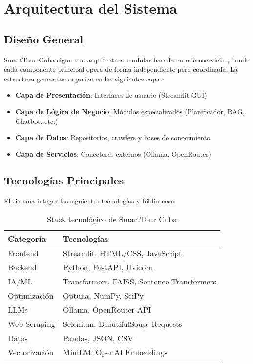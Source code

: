 \documentclass[runningheads]{llncs}
\begin{document}
\section{Arquitectura del Sistema}

\subsection{Diseño General}

SmartTour Cuba sigue una arquitectura modular basada en microservicios, donde cada componente principal opera de forma independiente pero coordinada. La estructura general se organiza en las siguientes capas:

\begin{itemize}
\item \textbf{Capa de Presentación}: Interfaces de usuario (Streamlit GUI)
\item \textbf{Capa de Lógica de Negocio}: Módulos especializados (Planificador, RAG, Chatbot, etc.)
\item \textbf{Capa de Datos}: Repositorios, crawlers y bases de conocimiento
\item \textbf{Capa de Servicios}: Conectores externos (Ollama, OpenRouter)
\end{itemize}

\subsection{Tecnologías Principales}

El sistema integra las siguientes tecnologías y bibliotecas:

\begin{table}[H]
\centering
\begin{tabular}{ll}
\toprule
\textbf{Categoría} & \textbf{Tecnologías} \\
\midrule
Frontend & Streamlit, HTML/CSS, JavaScript \\
Backend & Python, FastAPI, Uvicorn \\
IA/ML & Transformers, FAISS, Sentence-Transformers \\
Optimización & Optuna, NumPy, SciPy \\
LLMs & Ollama, OpenRouter API \\
Web Scraping & Selenium, BeautifulSoup, Requests \\
Datos & Pandas, JSON, CSV \\
Vectorización & MiniLM, OpenAI Embeddings \\
\bottomrule
\end{tabular}
\caption{Stack tecnológico de SmartTour Cuba}
\end{table}
\end{document}
